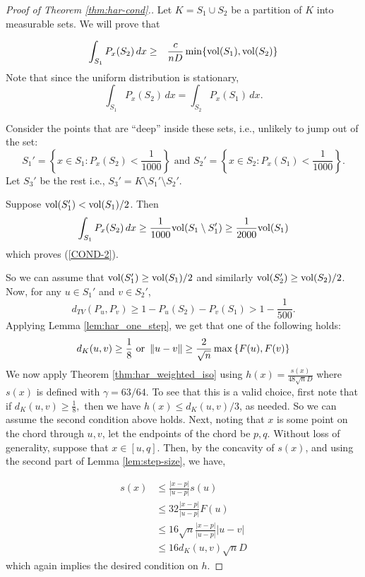 \begin{proof}[Proof of Theorem \ref{thm:har-cond}.]
 Let $K=S_{1}\cup S_{2}$ be a partition of $K$ into measurable
sets. We will prove that

\begin{eqnarray}
\int_{S_{1}}P_{x}(S_{2})\,dx & \ge & \frac{c}{nD}\min\{\mathrm{vol}(S_{1}),\mathrm{vol}(S_{2})\}\label{COND-2}
\end{eqnarray}
Note that since the uniform distribution is stationary, 
\[
\int_{S_{1}}P_{x}(S_{2})\,dx=\int_{S_{2}}P_{x}(S_{1})\,dx.
\]

Consider the points that are ``deep'' inside these sets, i.e., unlikely
to jump out of the set: 
\[
S_{1}'=\left\{ x\in S_{1}:P_{x}(S_{2})<\frac{1}{1000}\right\} \mbox{ and }S_{2}'=\left\{ x\in S_{2}:P_{x}(S_{1})<\frac{1}{1000}\right\} .
\]
Let $S_{3}'$ be the rest i.e., $S_{3}'=K\setminus S_{1}'\setminus S_{2}'$.

Suppose $\mathrm{vol}(S_{1}')<\mathrm{vol}(S_{1})/2$. Then 
\[
\int_{S_{1}}P_{x}(S_{2})\,dx\ge\frac{1}{1000}\mathrm{vol}(S_{1}\setminus S_{1}')\geq\frac{1}{2000}\mathrm{vol}(S_{1})
\]
which proves (\ref{COND-2}).

So we can assume that $\mathrm{vol}(S_{1}')\geq\mathrm{vol}(S_{1})/2$ and similarly
$\mathrm{vol}(S_{2}')\geq\mathrm{vol}(S_{2})/2$. Now, for any $u\in S_{1}'$ and
$v\in S_{2}'$, 
\[
d_{TV}(P_{u},P_{v})\geq1-P_{u}(S_{2})-P_{v}(S_{1})>1-\frac{1}{500}.
\]
Applying Lemma \ref{lem:har_one_step}, we get that one of the following
holds:
\[
d_{K}(u,v)\ge\frac{1}{8}\mbox{ or }\left\Vert u-v\right\Vert\ge\frac{2}{\sqrt{n}}\max\left\{ F(u),F(v)\right\} 
\]
We now apply Theorem \ref{thm:har_weighted_iso} using $h(x)=\frac{s(x)}{48\sqrt{n}D}$
where $s(x)$ is defined with $\gamma=63/64.$ To see that this is
a valid choice, first note that if $d_{K}(u,v)\ge\frac{1}{8},$ then
we have $h(x)\le d_{K}(u,v)/3$, as needed. So we can assume the second
condition above holds. Next, noting that $x$ is some point on the
chord through $u,v$, let the endpoints of the chord be $p,q.$ Without
loss of generality, suppose that $x\in[u,q]$. Then, by the concavity
of $s(x)$, and using the second part of Lemma \ref{lem:step-size},
we have,

\begin{align*}
s(x) & \le\frac{|x-p|}{|u-p|}s(u)\\
 & \le32\frac{|x-p|}{|u-p|}F(u)\\
 & \le16\sqrt{n}\frac{|x-p|}{|u-p|}\left|u-v\right|\\
 & \le16d_{K}(u,v)\sqrt{n}D
\end{align*}
which again implies the desired condition on $h$. 


\end{proof}

